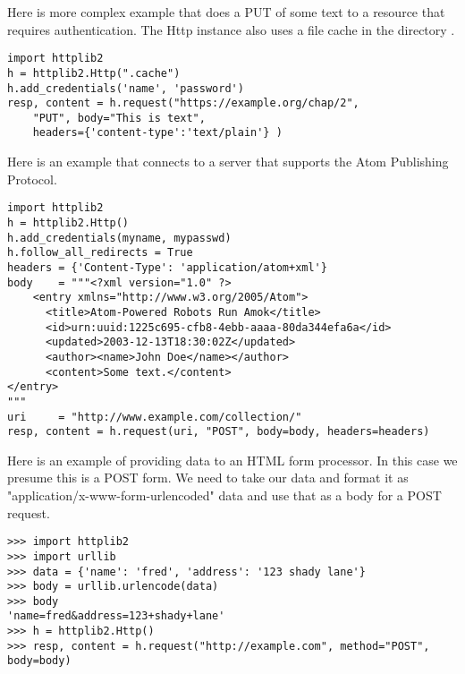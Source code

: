 Here is more complex example that does a PUT 
of some text to a resource that requires authentication.
The Http instance also uses a file cache
in the directory . 

\begin{verbatim}
import httplib2
h = httplib2.Http(".cache")
h.add_credentials('name', 'password')
resp, content = h.request("https://example.org/chap/2", 
    "PUT", body="This is text", 
    headers={'content-type':'text/plain'} )
\end{verbatim}

Here is an example that connects to a server that 
supports the Atom Publishing Protocol.

\begin{verbatim}
import httplib2
h = httplib2.Http()
h.add_credentials(myname, mypasswd)
h.follow_all_redirects = True
headers = {'Content-Type': 'application/atom+xml'}
body    = """<?xml version="1.0" ?>
    <entry xmlns="http://www.w3.org/2005/Atom">
      <title>Atom-Powered Robots Run Amok</title>
      <id>urn:uuid:1225c695-cfb8-4ebb-aaaa-80da344efa6a</id>
      <updated>2003-12-13T18:30:02Z</updated>
      <author><name>John Doe</name></author>
      <content>Some text.</content>
</entry>
"""
uri     = "http://www.example.com/collection/"
resp, content = h.request(uri, "POST", body=body, headers=headers)
\end{verbatim}

Here is an example of providing data to an HTML form processor.
In this case we presume this is a POST form. We need to take our 
data and format it as "application/x-www-form-urlencoded" data and use that as a 
body for a POST request.

\begin{verbatim}
>>> import httplib2
>>> import urllib
>>> data = {'name': 'fred', 'address': '123 shady lane'}
>>> body = urllib.urlencode(data)
>>> body
'name=fred&address=123+shady+lane'
>>> h = httplib2.Http()
>>> resp, content = h.request("http://example.com", method="POST", body=body)
\end{verbatim}
